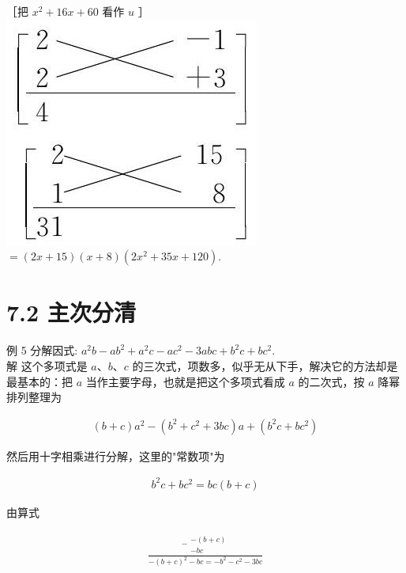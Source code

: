 \documentclass[10pt]{article}
\begin{document}
［把 $x^{2}+16 x+60$ 看作 $u$ ］\\
\includegraphics[max width=\textwidth, center]{2024_10_30_bd799899fef40368a068g-048}\\
$=(2 x+15)(x+8)\left(2 x^{2}+35 x+120\right)$.

\section*{7.2 主次分清}
例 5 分解因式: $a^{2} b-a b^{2}+a^{2} c-a c^{2}-3 a b c+b^{2} c+b c^{2}$.\\
解 这个多项式是 $a 、 b 、 c$ 的三次式，项数多，似乎无从下手，解决它的方法却是最基本的：把 $a$ 当作主要字母，也就是把这个多项式看成 $a$ 的二次式，按 $a$ 降幂排列整理为

\begin{align*}
(b+c) a^{2}-\left(b^{2}+c^{2}+3 b c\right) a+\left(b^{2} c+b c^{2}\right)
\end{align*}

然后用十字相乘进行分解，这里的"常数项"为

\begin{align*}
b^{2} c+b c^{2}=b c(b+c)
\end{align*}

由算式

\begin{align*}
\frac{-\begin{array}{c}
-(b+c) \\
-b c
\end{array}}{-(b+c)^{2}-b c=-b^{2}-c^{2}-3 b c}
\end{align*}
\end{document}
